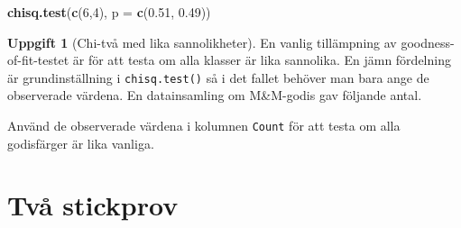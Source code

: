 \documentclass[
]{book}
\newenvironment{Shaded}{\begin{snugshade}}{\end{snugshade}}
\newcommand{\AttributeTok}[1]{\textcolor[rgb]{0.13,0.29,0.53}{#1}}
\newcommand{\DecValTok}[1]{\textcolor[rgb]{0.00,0.00,0.81}{#1}}
\newcommand{\FloatTok}[1]{\textcolor[rgb]{0.00,0.00,0.81}{#1}}
\newcommand{\FunctionTok}[1]{\textcolor[rgb]{0.13,0.29,0.53}{\textbf{#1}}}
\newcommand{\NormalTok}[1]{#1}
\newcommand{\OtherTok}[1]{\textcolor[rgb]{0.56,0.35,0.01}{#1}}
\newcommand{\SpecialCharTok}[1]{\textcolor[rgb]{0.81,0.36,0.00}{\textbf{#1}}}
\newcommand{\StringTok}[1]{\textcolor[rgb]{0.31,0.60,0.02}{#1}}
\theoremstyle{definition}
\theoremstyle{definition}
\theoremstyle{definition}
\newtheorem{exercise}{Uppgift}[chapter]
\theoremstyle{definition}
\theoremstyle{remark}
\begin{document}
\begin{Shaded}
\begin{Highlighting}[]
\FunctionTok{chisq.test}\NormalTok{(}\FunctionTok{c}\NormalTok{(}\DecValTok{6}\NormalTok{,}\DecValTok{4}\NormalTok{), }\AttributeTok{p =} \FunctionTok{c}\NormalTok{(}\FloatTok{0.51}\NormalTok{, }\FloatTok{0.49}\NormalTok{))}
\end{Highlighting}
\end{Shaded}

\begin{exercise}[Chi-två med lika sannolikheter]
En vanlig tillämpning av goodness-of-fit-testet är för att testa om alla klasser är lika sannolika. En jämn fördelning är grundinställning i \texttt{chisq.test()} så i det fallet behöver man bara ange de observerade värdena. En datainsamling om M\&M-godis gav följande antal.

\begin{Shaded}
\end{Shaded}

Använd de observerade värdena i kolumnen \texttt{Count} för att testa om alla godisfärger är lika vanliga.
\end{exercise}

\section{Två stickprov}\label{tvuxe5-stickprov}
\end{document}
